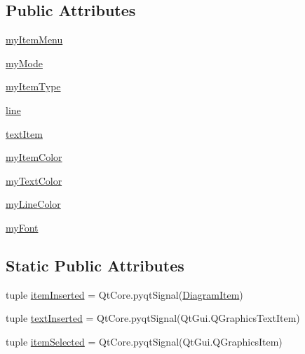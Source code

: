 \subsection*{Public Attributes}
\begin{DoxyCompactItemize}
\item 
\hyperlink{classdiagramscene_1_1DiagramScene_ad231a30bf1c365b44ef6cb5beb3c81ac}{my\+Item\+Menu}
\item 
\hyperlink{classdiagramscene_1_1DiagramScene_adab9965b65199e239bd215545413c6ca}{my\+Mode}
\item 
\hyperlink{classdiagramscene_1_1DiagramScene_adc5e7dcede78b08b67728a1588765d24}{my\+Item\+Type}
\item 
\hyperlink{classdiagramscene_1_1DiagramScene_a1e66f7b5f3e57b9327991fb5f09c2cf4}{line}
\item 
\hyperlink{classdiagramscene_1_1DiagramScene_adb77e28e44cc270067b7d3e6e4f3a267}{text\+Item}
\item 
\hyperlink{classdiagramscene_1_1DiagramScene_ade3d65a6e8365b024385d0d4808a567e}{my\+Item\+Color}
\item 
\hyperlink{classdiagramscene_1_1DiagramScene_a40cdd6f74c98d37f724dab4d1e188a74}{my\+Text\+Color}
\item 
\hyperlink{classdiagramscene_1_1DiagramScene_a20a0692adebe0524b75870cf4fb87f5e}{my\+Line\+Color}
\item 
\hyperlink{classdiagramscene_1_1DiagramScene_ac2718ac9dd217595936c141037c2a0bf}{my\+Font}
\end{DoxyCompactItemize}
\subsection*{Static Public Attributes}
\begin{DoxyCompactItemize}
\item 
tuple \hyperlink{classdiagramscene_1_1DiagramScene_ac87a04452248cc5928ab9c8771798afd}{item\+Inserted} = Qt\+Core.\+pyqt\+Signal(\hyperlink{classdiagramscene_1_1DiagramItem}{Diagram\+Item})
\item 
tuple \hyperlink{classdiagramscene_1_1DiagramScene_a512f0042864d9cc21f898a96c4bfed3e}{text\+Inserted} = Qt\+Core.\+pyqt\+Signal(Qt\+Gui.\+Q\+Graphics\+Text\+Item)
\item 
tuple \hyperlink{classdiagramscene_1_1DiagramScene_ac1cf259a77ff38af3967e66134e00201}{item\+Selected} = Qt\+Core.\+pyqt\+Signal(Qt\+Gui.\+Q\+Graphics\+Item)
\end{DoxyCompactItemize}


